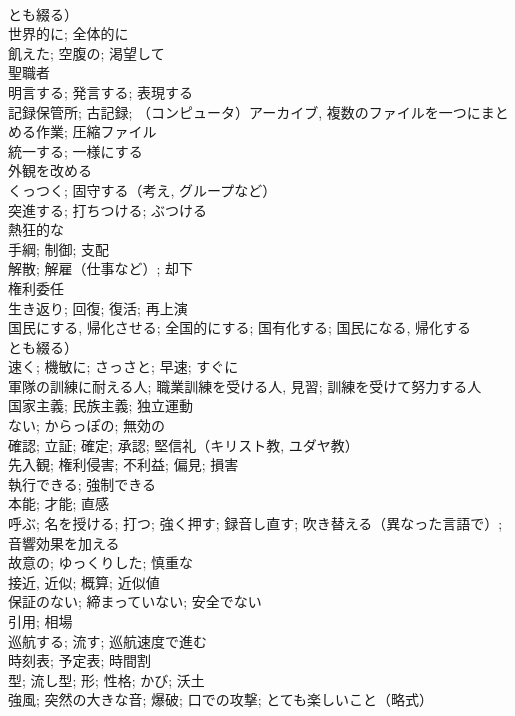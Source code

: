 \documentclass[8pt]{extreport}
\begin{document}
\begin{CJK}{UTF8}{min}
\\	とも綴る）	
\\	世界的に; 全体的に	
\\	飢えた; 空腹の; 渇望して	
\\	聖職者	
\\	明言する; 発言する; 表現する	
\\	記録保管所; 古記録; （コンピュータ）アーカイブ, 複数のファイルを一つにまとめる作業; 圧縮ファイル	
\\	統一する; 一様にする	
\\	外観を改める	
\\	くっつく; 固守する（考え, グループなど）	
\\	突進する; 打ちつける; ぶつける	
\\	熱狂的な	
\\	手綱; 制御; 支配	
\\	解散; 解雇（仕事など）; 却下	
\\	権利委任	
\\	生き返り; 回復; 復活; 再上演	
\\	国民にする, 帰化させる; 全国的にする; 国有化する; 国民になる, 帰化する
\\	とも綴る）	
\\	速く; 機敏に; さっさと; 早速; すぐに	
\\	軍隊の訓練に耐える人; 職業訓練を受ける人, 見習; 訓練を受けて努力する人	
\\	国家主義; 民族主義; 独立運動	
\\	ない; からっぽの; 無効の	
\\	確認; 立証; 確定; 承認; 堅信礼（キリスト教, ユダヤ教）	
\\	先入観; 権利侵害; 不利益; 偏見; 損害	
\\	執行できる; 強制できる	
\\	本能; 才能; 直感	
\\	呼ぶ; 名を授ける; 打つ; 強く押す; 録音し直す; 吹き替える（異なった言語で）; 音響効果を加える	
\\	故意の; ゆっくりした; 慎重な	
\\	接近, 近似; 概算; 近似値	
\\	保証のない; 締まっていない; 安全でない	
\\	引用; 相場	
\\	巡航する; 流す; 巡航速度で進む	
\\	時刻表; 予定表; 時間割	
\\	型; 流し型; 形; 性格; かび; 沃土	
\\	強風; 突然の大きな音; 爆破; 口での攻撃; とても楽しいこと（略式）	

\end{CJK}
\end{document}
